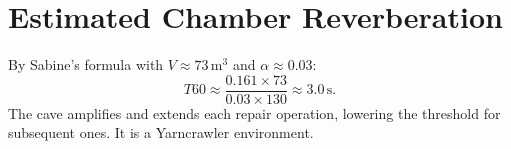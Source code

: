 \section{Estimated Chamber Reverberation}

By Sabine's formula with $V \approx 73\,\text{m}^3$ and $\alpha \approx 0.03$:
\[
  T {60} \approx \frac{0.161 \times 73}{0.03 \times 130} \approx 3.0\,\text{s}.
\]
The cave amplifies and extends each repair operation, lowering the threshold for
subsequent ones. It is a Yarncrawler environment.
